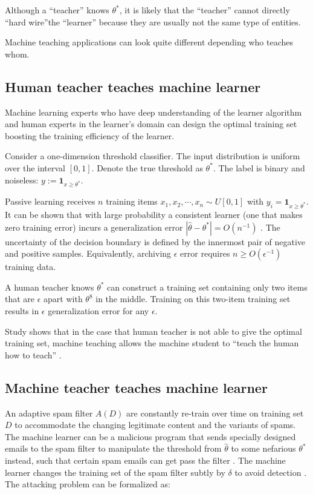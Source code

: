     Although a ``teacher'' knows $\theta^*$,
    it is likely that the ``teacher'' cannot directly ``hard wire''the ``learner''
    because they are usually not the same type of entities.

    Machine teaching applications can look quite different depending who teaches whom.

    \subsection{Human teacher teaches machine learner}

        Machine learning experts who have deep understanding of the learner algorithm
        and human experts in the learner's domain can design the optimal training set
        boosting the training efficiency of the learner.

        Consider a one-dimension threshold classifier.
        The input distribution is uniform over the interval $[0,1]$.
        Denote the true threshold as $\theta^*$.
        The label is binary and noiseless: $y := \bm{1}_{x \geq \theta^*}$.

        Passive learning receives $n$ training items
        $x_1, x_2, \cdots, x_n \sim U[0,1]$ with $y_i = \bm{1}_{x \geq \theta^*}$.
        It can be shown that with large probability a consistent learner (one that makes zero training error)
        incurs a generalization error $\left|\hat{\theta} - \theta^*\right| = O(n^{-1})$ \cite{Zhu2018}.
        The uncertainty of the decision boundary is defined by the innermost pair of negative and positive samples.
        Equivalently, archiving $\epsilon$ error requires $n \geq O(\epsilon^{-1})$ training data.

        A human teacher knows $\theta^*$ can construct a training set containing only two items
        that are $\epsilon$ apart with $\theta^8$ in the middle.
        Training on this two-item training set results in $\epsilon$ generalization error for any $\epsilon$.

        Study shows that in the case that human teacher is not able to give the optimal training set,
        machine teaching allows the machine student to ``teach the human how to teach'' \cite{Suh2016}.

    \subsection{Machine teacher teaches machine learner}

        An adaptive spam filter $A(D)$ are constantly re-train over time on training set $D$ to accommodate
        the changing legitimate content and the variants of spams.
        The machine learner can be a malicious program that sends specially designed emails
        to the spam filter to manipulate the threshold from $\hat{\theta}$ to some nefarious $\theta^*$ instead,
        such that certain spam emails can get pass the filter \cite{Alfeld2016}.
        The machine learner changes the training set of the spam filter subtly by $\delta$ to avoid detection \cite{Mei2015}.
        The attacking problem can be formalized as:

